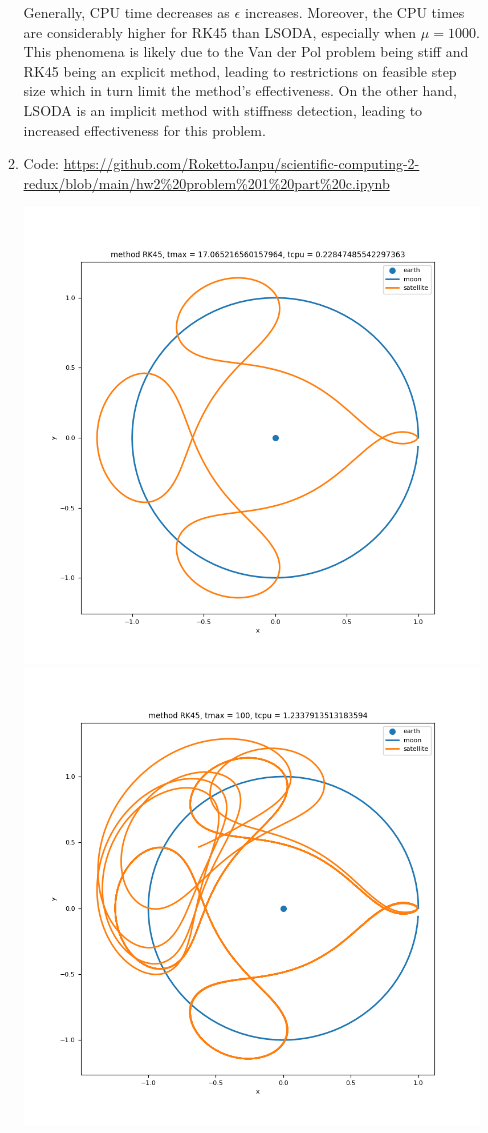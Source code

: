 \documentclass{article}
\newcommand{\ep}{\epsilon}
\begin{document}
\begin{enumerate}
\begin{enumerate}[label=(\alph*)]
	Generally, CPU time decreases as $\ep$ increases. Moreover, the CPU times are considerably higher for RK45 than LSODA, especially when $\mu=1000$. This phenomena is likely due to the Van der Pol problem being stiff and RK45 being an explicit method, leading to restrictions on feasible step size which in turn limit the method's effectiveness. On the other hand, LSODA is an implicit method with stiffness detection, leading to increased effectiveness for this problem.
	
	\item Code: \url{https://github.com/RokettoJanpu/scientific-computing-2-redux/blob/main/hw2%20problem%201%20part%20c.ipynb}
	
	\begin{center}
		\includegraphics[scale=.3]{hw2 p1c 1}
		\includegraphics[scale=.3]{hw2 p1c 2}

\end{center}
\end{enumerate}
\end{enumerate}
\end{document}
